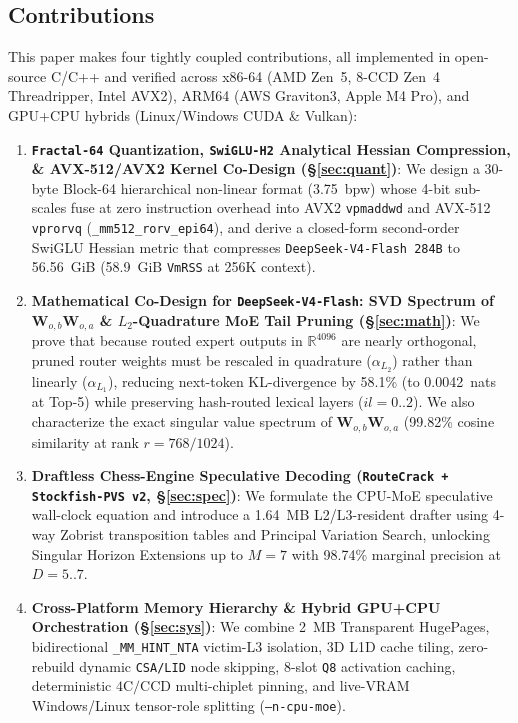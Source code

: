 \documentclass[10pt,twocolumn]{article}
\begin{document}
\subsection{Contributions}
This paper makes four tightly coupled contributions, all implemented in open-source C/C++ and verified across x86-64 (AMD Zen~5, 8-CCD Zen~4 Threadripper, Intel AVX2), ARM64 (AWS Graviton3, Apple M4 Pro), and GPU+CPU hybrids (Linux/Windows CUDA \& Vulkan):
\begin{enumerate}
    \item \textbf{\texttt{Fractal-64} Quantization, \texttt{SwiGLU-H2} Analytical Hessian Compression, \& AVX-512/AVX2 Kernel Co-Design (\S\ref{sec:quant})}: We design a 30-byte Block-64 hierarchical non-linear format (3.75~bpw) whose 4-bit sub-scales fuse at zero instruction overhead into AVX2 \texttt{vpmaddwd} and AVX-512 \texttt{vprorvq} (\texttt{\_mm512\_rorv\_epi64}), and derive a closed-form second-order SwiGLU Hessian metric that compresses \texttt{DeepSeek-V4-Flash 284B} to 56.56~GiB (58.9~GiB \texttt{VmRSS} at 256K context).
    \item \textbf{Mathematical Co-Design for \texttt{DeepSeek-V4-Flash}: SVD Spectrum of $\mathbf{W}_{o,b}\mathbf{W}_{o,a}$ \& $L_2$-Quadrature MoE Tail Pruning (\S\ref{sec:math})}: We prove that because routed expert outputs in $\mathbb{R}^{4096}$ are nearly orthogonal, pruned router weights must be rescaled in quadrature ($\alpha_{L_2}$) rather than linearly ($\alpha_{L_1}$), reducing next-token KL-divergence by 58.1\% (to 0.0042~nats at Top-5) while preserving hash-routed lexical layers ($il=0..2$). We also characterize the exact singular value spectrum of $\mathbf{W}_{o,b}\mathbf{W}_{o,a}$ (99.82\% cosine similarity at rank $r=768/1024$).
    \item \textbf{Draftless Chess-Engine Speculative Decoding (\texttt{RouteCrack + Stockfish-PVS v2}, \S\ref{sec:spec})}: We formulate the CPU-MoE speculative wall-clock equation and introduce a 1.64~MB L2/L3-resident drafter using 4-way Zobrist transposition tables and Principal Variation Search, unlocking Singular Horizon Extensions up to $M=7$ with 98.74\% marginal precision at $D=5..7$.
    \item \textbf{Cross-Platform Memory Hierarchy \& Hybrid GPU+CPU Orchestration (\S\ref{sec:sys})}: We combine 2~MB Transparent HugePages, bidirectional \texttt{\_MM\_HINT\_NTA} victim-L3 isolation, 3D L1D cache tiling, zero-rebuild dynamic \texttt{CSA/LID} node skipping, 8-slot \texttt{Q8} activation caching, deterministic $4\text{C/CCD}$ multi-chiplet pinning, and live-VRAM Windows/Linux tensor-role splitting (\texttt{--n-cpu-moe}).
\end{enumerate}
\end{document}

